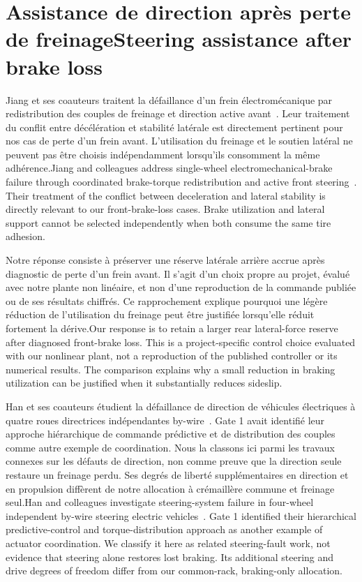 \documentclass[11pt,a4paper,oneside]{report}
\newcommand{\bi}[2]{\iffrench #2\else #1\fi}
\renewcommand{\sec}[2]{\section{\bi{#1}{#2}}}
\begin{document}
\sec{Steering assistance after brake loss}{Assistance de direction après perte de freinage}
\bi{Jiang and colleagues address single-wheel electromechanical-brake failure through coordinated brake-torque redistribution and active front steering~\cite{jiang}. Their treatment of the conflict between deceleration and lateral stability is directly relevant to our front-brake-loss cases. Brake utilization and lateral support cannot be selected independently when both consume the same tire adhesion.}{Jiang et ses coauteurs traitent la défaillance d'un frein électromécanique par redistribution des couples de freinage et direction active avant~\cite{jiang}. Leur traitement du conflit entre décélération et stabilité latérale est directement pertinent pour nos cas de perte d'un frein avant. L'utilisation du freinage et le soutien latéral ne peuvent pas être choisis indépendamment lorsqu'ils consomment la même adhérence.}

\bi{Our response is to retain a larger rear lateral-force reserve after diagnosed front-brake loss. This is a project-specific control choice evaluated with our nonlinear plant, not a reproduction of the published controller or its numerical results. The comparison explains why a small reduction in braking utilization can be justified when it substantially reduces sideslip.}{Notre réponse consiste à préserver une réserve latérale arrière accrue après diagnostic de perte d'un frein avant. Il s'agit d'un choix propre au projet, évalué avec notre plante non linéaire, et non d'une reproduction de la commande publiée ou de ses résultats chiffrés. Ce rapprochement explique pourquoi une légère réduction de l'utilisation du freinage peut être justifiée lorsqu'elle réduit fortement la dérive.}

\bi{Han and colleagues investigate steering-system failure in four-wheel independent by-wire steering electric vehicles~\cite{han}. Gate 1 identified their hierarchical predictive-control and torque-distribution approach as another example of actuator coordination. We classify it here as related steering-fault work, not evidence that steering alone restores lost braking. Its additional steering and drive degrees of freedom differ from our common-rack, braking-only allocation.}{Han et ses coauteurs étudient la défaillance de direction de véhicules électriques à quatre roues directrices indépendantes by-wire~\cite{han}. Gate 1 avait identifié leur approche hiérarchique de commande prédictive et de distribution des couples comme autre exemple de coordination. Nous la classons ici parmi les travaux connexes sur les défauts de direction, non comme preuve que la direction seule restaure un freinage perdu. Ses degrés de liberté supplémentaires en direction et en propulsion diffèrent de notre allocation à crémaillère commune et freinage seul.}
\end{document}
